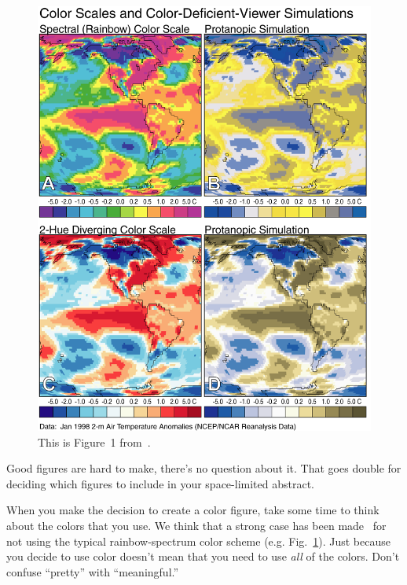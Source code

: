 \documentclass[twoside, 10pt]{article}
\begin{document}
\begin{figure}[b]
\begin{center}
\includegraphics[width=\columnwidth]{lb_fig1.png}
\caption[Color Scales and Color-Deficient-Viewer Simulations]{\label{color_scales}
    This is Figure~1 from~\cite{light2004end}.}
\end{center}
\end{figure}

Good figures are hard to make, there's no question about it.  That
goes double for deciding which figures to include in your 
space-limited abstract.

When you make the decision to create a color figure, take some time
to think about the colors that you use.  We think that a  strong case has 
been made~\citep{light2004end,borland2007rainbow} for not using the
typical rainbow-spectrum color scheme (e.g. Fig.~\ref{color_scales}).
Just because you decide to use color doesn't mean that you need to
use \emph{all} of the colors.  Don't confuse ``pretty'' with
``meaningful.''
\end{document}

